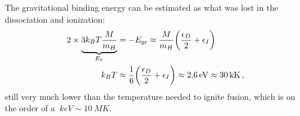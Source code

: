 \documentclass[main.tex]{subfiles}
\begin{document}
The gravitational binding energy can be estimated as what was lost in the dissociation and ionization:
%
\begin{align}
  2 \times \underbrace{3 k_B T \frac{M}{m_H }}_{E_k}
  &= - E _{\text{gr}} \approx \frac{M}{m_H} \qty(\frac{\epsilon_{D}}{2} + \epsilon_{I})  \\
  k_B T &\approx \frac{1}{6} \qty( \frac{\epsilon _D}{2} + \epsilon _I) \approx \SI{2.6}{eV} \approx \SI{30}{kK}
\,,
\end{align}
%
still very much lower than the temperature needed to ignite fusion, which is on the order of a \(\SI{}{keV} \sim \SI{10}{MK}\).
\end{document}
